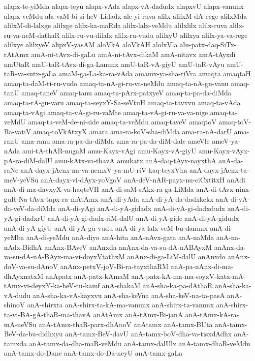 {alapx-te-yiMda
alapx-teyu
alapx-vAda
alapx-vA-dadudx
alapxvU
alapx-vanunx
alapx-veMdu
ala-vaM-bi-si-heV-Lidadx
ale-yi-ruva
alilx
alilxM-dA-cege
alilxMda
alilxM-di-lalxge
alilxge
alilx-ka-maRda
alilx-lalx-veMdu
alilxlilx
alilx-ruva
alilx-ru-va-neM-dathaR
alilx-ru-vu-dilalx
alilx-ru-vudu
alilxyU
alilxya
alilx-ya-va-rege
alilxye
alilxyeV
alipxV-yasAM
aloVkA
aloVkAH
alolxVla
alu-patx-daq-SiTx-rAtAmx
amA-ni-tAvx-di-gaLu
amA-ni-tAvx-dikaM
amA-nitavx
amA-tAyxdi
amUtaR
amU-taR-tAvx-di-ga-Lanunx
amU-taR-vA-giyU
amU-taR-vAyu
amU-taR-va-sutx-gaLa
amaM-ga-La-ka-ra-vAda
amamx-ya-sha-riVra
amaqta
amaqtaH
amaq-ta-daM-ti-ru-vudo
amaq-ta-nA-gi-ru-va-neMdu
amaq-ta-nA-gu-vanu
amaq-tanU
amaq-taneV
amaq-tanu
amaq-ta-pArx-patxyeV
amaq-ta-pa-da-diMda
amaq-ta-rA-gu-varu
amaq-ta-seyxY-Sa-seVtuH
amaq-ta-tavxvu
amaq-ta-vAda
amaq-ta-vAgi
amaq-ta-vA-gi-ru-vaMte
amaq-ta-vA-gi-ru-va-va-nige
amaq-ta-veMdU
amaq-ta-veM-de-ni-side
amaq-ta-veMdu
amaq-taveV
amaqtoV
amaq-toV-Ba-vatiV
amaq-toVkAtxyX
amara
ama-ra-koV-sha-diMda
ama-ra-nA-darU
ama-ranU
ama-ranu
ama-ra-pa-da-diMda
ama-ra-pa-da-diM-dale
ameVle
ameV-ya-nAda
ami-tA-thAR-nugaM
amu-Kayx-vAgi
amu-Kayx-vA-giyU
amu-Kayx-vAyx-pA-ra-diM-dalU
amu-kAtx-va-thavA
amukatx
anA-daq-tAyx-nayxthA
anA-da-raNe
anA-dayx-jAcnx-na-va-nemxV-ya-mU-riV-kaq-teyxVha
anA-dayx-jAcnx-ta-meV-yeVSu
anA-dayx-vi-dAyx-yoVgoV
anA-deV-nAR-payx-nu-ciCxtitxH
anAdi
anA-di-ma-davxyX-va-haqteVH
anA-di-saM-sAkx-ra-ga-LiMda
anA-di-tAvx-ninx-guR-Na-tAvx-tapx-ra-mAtAmx
anA-di-yAda
anA-di-yA-da-dadxkekx
anA-di-yA-da-veV-da-diMda
anA-di-yAgi
anA-di-yA-gidadx
anA-di-yA-gi-dadxdudx
anA-di-yA-gi-dadxrU
anA-di-yA-gi-dadx-riM-dalU
anA-di-yA-gide
anA-di-yA-gidudx
anA-di-yA-giyU
anA-di-yA-gu-vudu
anA-di-ya-lalx-veM-bu-danunx
anA-di-yeMba
anA-di-yeMdu
anA-diyo
anA-hita
anA-nAvx-gata
anA-naMda
anA-na-nAdx-BidhA
anAnx-BAveV
anAnxda
anAnx-da-va-su-dA-nABAyxM
anAnx-da-va-su-dA-nA-BAyx-ma-vi-doyxVtathxM
anAnx-di-ga-LiM-dalU
anAnxdo
anAnx-doV-va-su-dAnoV
anAnx-petxV-joV-Bi-ra-tayxthaRM
anA-pa-nAnx-di-ma-dhAyxnatxM
anApatx
anA-patx-kAmaM
anA-patx-kA-ma-ma-soyxV-katx-mA-tAmx-vi-deyxY-ka-heV-tu-kamf
anA-shakaM
anA-sha-ka-pa-dAthaR
anA-sha-ka-vA-dudu
anA-sha-ka-vA-kayxvu
anA-sha-keVna
anA-sha-keV-na-ta-pasA
anA-shinoV
anA-shirxta
anA-shirx-ta-kA-ma-vanunx
anA-shirx-ta-vanunx
anA-shirx-ta-vi-BA-gA-thaR-ma-thavA
anAtAmx
anA-tAmx-Bi-janA
anA-tAmx-kA-ra-mA-neVSu
anA-tAmx-thaR-parx-dhAnoV
anAtamx
anA-tamx-BUta
anA-tamx-BeV-da-bu-didhxyu
anA-tamx-BeV-davU
anA-tamx-boV-dha-va-tisxdAdhx
anA-tamxda
anA-tamx-da-dha-maR-veMdu
anA-tamx-dalUlx
anA-tamx-dhaR-veMdu
anA-tamx-do-Dane
anA-tamx-do-Da-neyU
anA-tamx-gaLa
}
